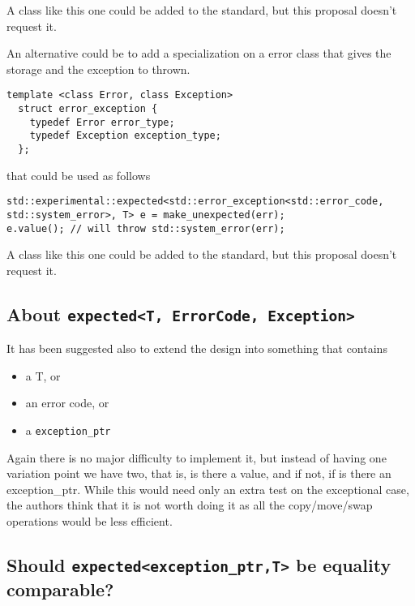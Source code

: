 \documentclass[a4paper,10pt]{article}
\newcommand{\cpp}[1]{\lstinline{#1}}
\begin{document}
\noindent
A class like this one could be added to the standard, but this proposal doesn't request it. 

An alternative could be to add a specialization on a error class that gives the storage and the exception to thrown.

\begin{lstlisting}
template <class Error, class Exception>
  struct error_exception {
    typedef Error error_type;
    typedef Exception exception_type;
  };
\end{lstlisting}

\noindent
that could be used as follows

\begin{lstlisting}
std::experimental::expected<std::error_exception<std::error_code, std::system_error>, T> e = make_unexpected(err);
e.value(); // will throw std::system_error(err);
\end{lstlisting}

A class like this one could be added to the standard, but this proposal doesn't request it. 

\subsection{About \cpp{expected<T, ErrorCode, Exception>}}

It has been suggested also to extend the design into something that contains 

\begin{itemize}
\item a T, or
\item an error code, or
\item a \cpp{exception_ptr} 
\end{itemize}

Again there is no major difficulty to implement it, but instead of having one variation point we have two, that is, is there a value, and if not, if is there an exception_ptr. While this would need only an extra test on the exceptional case, the authors think that it is not worth doing it as all the copy/move/swap operations would be less efficient. 

\subsection{Should \cpp{expected<exception_ptr,T>} be equality comparable?}
\end{document}
